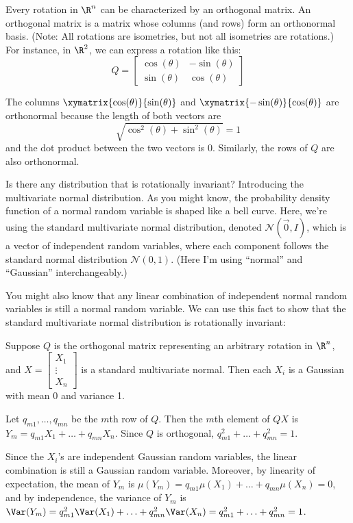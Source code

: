 \documentclass{article}
\begin{document}
Every rotation in $\R^n$ can be characterized by an orthogonal matrix. An orthogonal matrix is a matrix whose columns (and rows) form an orthonormal basis. (Note: All rotations are isometries, but not all isometries are rotations.) For instance, in $\R^2$, we can express a rotation like this:
\[
  Q = \begin{bmatrix}
    \cos(\theta) & -\sin(\theta) \\
    \sin(\theta) & \cos(\theta)
  \end{bmatrix}
\]

The columns $\xymatrix{\cos(\theta)}{\sin(\theta)}$ and $\xymatrix{-\sin(\theta)}{\cos(\theta)}$ are orthonormal because the length of both vectors are
\[
  \sqrt{\cos^2(\theta) + \sin^2(\theta)} = 1
\]
and the dot product between the two vectors is 0. Similarly, the rows of $Q$ are also orthonormal.


Is there any distribution that is rotationally invariant? Introducing the multivariate normal distribution. As you might know, the probability density function of a normal random variable is shaped like a bell curve. Here, we're using the standard multivariate normal distribution, denoted $\mathcal{N}(\vec{0}, I)$, which is a vector of independent random variables, where each component follows the standard normal distribution $\mathcal{N}(0, 1)$. (Here I'm using ``normal'' and ``Gaussian'' interchangeably.)

You might also know that any linear combination of independent normal random variables is still a normal random variable. We can use this fact to show that the standard multivariate normal distribution is rotationally invariant:

Suppose $Q$ is the orthogonal matrix representing an arbitrary rotation in $\R^n$, and
$X = \begin{bmatrix}
    X_1 \\ \vdots \\ X_n
  \end{bmatrix}$ is a standard multivariate normal. Then each $X_i$ is a Gaussian with mean 0 and variance 1.

Let $q_{m1}, \ldots, q_{mn}$ be the $m$th row of $Q$. Then the $m$th element of $QX$ is $Y_m = q_{m1} X_1 + \ldots + q_{mn} X_n$. Since $Q$ is orthogonal, $q_{m1}^2 + \ldots + q_{mn}^2 = 1$.

Since the $X_i$'s are independent Gaussian random variables, the linear combination is still a Gaussian random variable. Moreover, by linearity of expectation, the mean of $Y_m$ is $\mu(Y_m) = q_{m1} \mu(X_1) + \ldots + q_{mn} \mu(X_n) = 0$, and by independence, the variance of $Y_m$ is $\Var(Y_m) = q_{m1}^2 \Var(X_1) + \ldots + q_{mn}^2 \Var(X_n) = q_{m1}^2 + \ldots + q_{mn}^2 = 1$.
\end{document}
